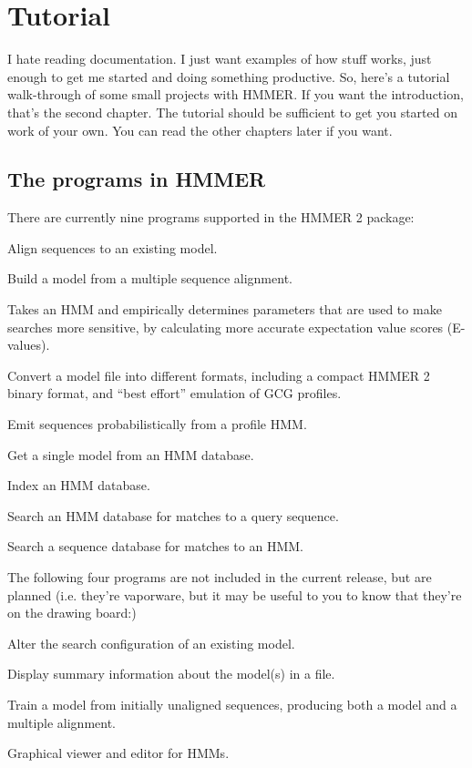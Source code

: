 \chapter{Tutorial}

I hate reading documentation. I just want examples of how stuff works,
just enough to get me started and doing something productive. So,
here's a tutorial walk-through of some small projects with HMMER. If
you want the introduction, that's the second chapter. The tutorial
should be sufficient to get you started on work of your own. You can
read the other chapters later if you want.

\section {The programs in HMMER}

There are currently nine programs supported in the HMMER 2 package:

\begin{wideitem}
\item[\emprog{hmmalign}] Align sequences to an existing model.
\item[\emprog{hmmbuild}] Build a model from a multiple sequence alignment.
\item[\emprog{hmmcalibrate}] Takes an HMM and empirically determines
parameters that are used to make searches more sensitive, by
calculating more accurate expectation value scores (E-values).
\item[\emprog{hmmconvert}] Convert a model file into different formats,
including a compact HMMER 2 binary format, and ``best effort''
emulation of GCG profiles.
\item[\emprog{hmmemit}] Emit sequences probabilistically from a profile HMM.
\item[\emprog{hmmfetch}] Get a single model from an HMM database.
\item[\emprog{hmmindex}] Index an HMM database.
\item[\emprog{hmmpfam}] Search an HMM database for matches to a query sequence.
\item[\emprog{hmmsearch}] Search a sequence database for matches to an HMM.
\end{wideitem}

The following four programs are not included in the current release,
but are planned (i.e. they're vaporware, but it may be useful to you
to know that they're on the drawing board:)

\begin{wideitem}
\item[\emprog{hmmconfig}] Alter the search configuration of an existing model.
\item[\emprog{hmminfo}] Display summary information about the model(s) in a file.
\item[\emprog{hmmtrain}] Train a model from initially unaligned sequences,
producing both a model and a multiple alignment.
\item[\emprog{hmmview}] Graphical viewer and editor for HMMs.
\end{wideitem}

